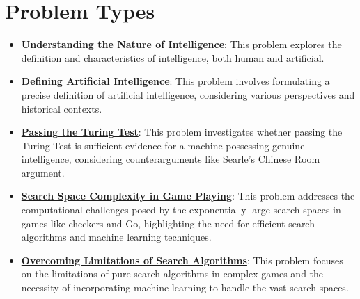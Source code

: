 \documentclass{article}%
\begin{document}
\section{Problem Types}%
\label{sec:ProblemTypes}%
\begin{itemize}[leftmargin=*]%
\item \href{https://purdue.brightspace.com/d2l/common/assets/pdfjs-d2l-dist/1.0.14-legacy/web/viewer.html?file=\%2Fcontent\%2Fenforced\%2F1095467-wl.202510.CS.24300.001\%2F02L2-Intro.pdf\%3Fou\%3D1095467\&lang=en-us\&container=d2l-fileviewer-rendered-pdf\&fullscreen=d2l-fileviewer-rendered-pdf-dialog\&height=667#page=3}{\textbf{Understanding the Nature of Intelligence}}: This problem explores the definition and characteristics of intelligence, both human and artificial.%
\item \href{https://purdue.brightspace.com/d2l/common/assets/pdfjs-d2l-dist/1.0.14-legacy/web/viewer.html?file=\%2Fcontent\%2Fenforced\%2F1095467-wl.202510.CS.24300.001\%2F02L2-Intro.pdf\%3Fou\%3D1095467\&lang=en-us\&container=d2l-fileviewer-rendered-pdf\&fullscreen=d2l-fileviewer-rendered-pdf-dialog\&height=667#page=5}{\textbf{Defining Artificial Intelligence}}: This problem involves formulating a precise definition of artificial intelligence, considering various perspectives and historical contexts.%
\item \href{https://purdue.brightspace.com/d2l/common/assets/pdfjs-d2l-dist/1.0.14-legacy/web/viewer.html?file=\%2Fcontent\%2Fenforced\%2F1095467-wl.202510.CS.24300.001\%2F02L2-Intro.pdf\%3Fou\%3D1095467\&lang=en-us\&container=d2l-fileviewer-rendered-pdf\&fullscreen=d2l-fileviewer-rendered-pdf-dialog\&height=667#page=6}{\textbf{Passing the Turing Test}}: This problem investigates whether passing the Turing Test is sufficient evidence for a machine possessing genuine intelligence, considering counterarguments like Searle's Chinese Room argument.%
\item \href{https://purdue.brightspace.com/d2l/common/assets/pdfjs-d2l-dist/1.0.14-legacy/web/viewer.html?file=\%2Fcontent\%2Fenforced\%2F1095467-wl.202510.CS.24300.001\%2F02L2-Intro.pdf\%3Fou\%3D1095467\&lang=en-us\&container=d2l-fileviewer-rendered-pdf\&fullscreen=d2l-fileviewer-rendered-pdf-dialog\&height=667#page=11}{\textbf{Search Space Complexity in Game Playing}}: This problem addresses the computational challenges posed by the exponentially large search spaces in games like checkers and Go, highlighting the need for efficient search algorithms and machine learning techniques.%
\item \href{https://purdue.brightspace.com/d2l/common/assets/pdfjs-d2l-dist/1.0.14-legacy/web/viewer.html?file=\%2Fcontent\%2Fenforced\%2F1095467-wl.202510.CS.24300.001\%2F02L2-Intro.pdf\%3Fou\%3D1095467\&lang=en-us\&container=d2l-fileviewer-rendered-pdf\&fullscreen=d2l-fileviewer-rendered-pdf-dialog\&height=667#page=12}{\textbf{Overcoming Limitations of Search Algorithms}}: This problem focuses on the limitations of pure search algorithms in complex games and the necessity of incorporating machine learning to handle the vast search spaces.%

\end{itemize}
\end{document}
